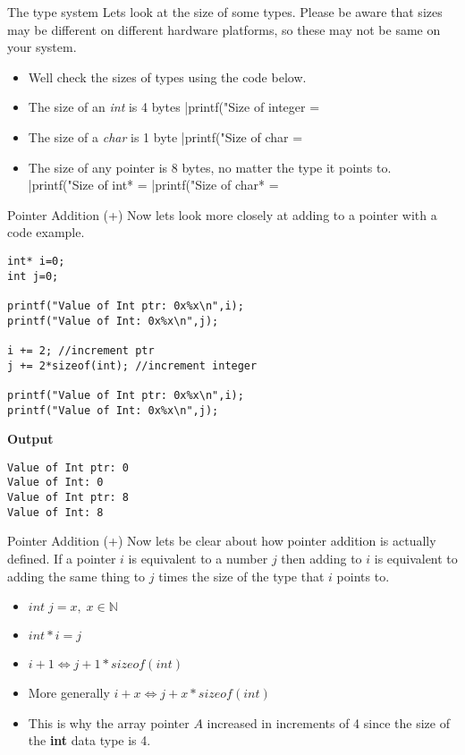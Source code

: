 \documentclass[10pt]{beamer}
\begin{document}
\begin{frame}[fragile]{The type system}
Lets look at the size of some types. Please be aware that sizes may be different on different hardware platforms, so these may not be same on your system.

\begin{itemize}[<+->]
	\item Well check the sizes of types using the code below.
	\item The size of an {\it int} is 4 bytes
	|printf("Size of integer = %
	\item The size of a {\it char} is 1 byte
	|printf("Size of char = %
	\item The size of any pointer is 8 bytes, no matter the type it points to.
	|printf("Size of int* = %
	|printf("Size of char* = %
\end{itemize}
\end{frame}

\begin{frame}[fragile]{Pointer Addition (+)}
Now lets look more closely at adding to a pointer with a code example.

\begin{verbatim}
int* i=0;
int j=0;

printf("Value of Int ptr: 0x%x\n",i);
printf("Value of Int: 0x%x\n",j);

i += 2; //increment ptr
j += 2*sizeof(int); //increment integer

printf("Value of Int ptr: 0x%x\n",i);
printf("Value of Int: 0x%x\n",j);
\end{verbatim}
{\bf Output}
\begin{verbatim}
Value of Int ptr: 0
Value of Int: 0
Value of Int ptr: 8
Value of Int: 8
\end{verbatim}
\end{frame}

\begin{frame}[fragile]{Pointer Addition (+)}
Now lets be clear about how pointer addition is actually defined. If a pointer $i$ is equivalent to a number $j$ then adding to $i$ is equivalent to adding the same thing to $j$ times the size of the type that $i$ points to.

\begin{itemize}[<+->]
	\item $int \; j = x, \; x \in \mathbb{N}$
	\item $int* i = j$
	\item $i + 1 \iff j + 1 * sizeof(int)$
	\item More generally $i + x \iff j + x * sizeof(int)$
	\item This is why the array pointer $A$ increased in increments of 4 since the size of the {\bf int} data type is 4.
\end{itemize}
\end{frame}
\end{document}
